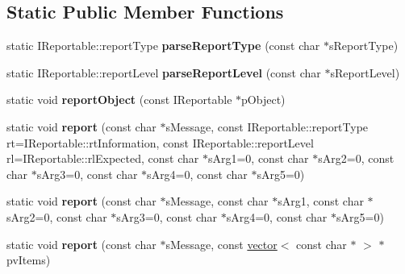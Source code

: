 \subsection*{\-Static \-Public \-Member \-Functions}
\begin{DoxyCompactItemize}
\item 
\hypertarget{classgeneral__server_1_1Debug_a8aa637f5c57017dda300b994b5d5d856}{static \-I\-Reportable\-::report\-Type {\bfseries parse\-Report\-Type} (const char $\ast$s\-Report\-Type)}\label{classgeneral__server_1_1Debug_a8aa637f5c57017dda300b994b5d5d856}

\item 
\hypertarget{classgeneral__server_1_1Debug_add6be0d439d64809767acf4dc7a276d1}{static \-I\-Reportable\-::report\-Level {\bfseries parse\-Report\-Level} (const char $\ast$s\-Report\-Level)}\label{classgeneral__server_1_1Debug_add6be0d439d64809767acf4dc7a276d1}

\item 
\hypertarget{classgeneral__server_1_1Debug_a096cdb9d3e27f8b37c7c15a867eb1047}{static void {\bfseries report\-Object} (const \-I\-Reportable $\ast$p\-Object)}\label{classgeneral__server_1_1Debug_a096cdb9d3e27f8b37c7c15a867eb1047}

\item 
\hypertarget{classgeneral__server_1_1Debug_aea15a6741aaa8d65629d28d6ee07df25}{static void {\bfseries report} (const char $\ast$s\-Message, const \-I\-Reportable\-::report\-Type rt=\-I\-Reportable\-::rt\-Information, const \-I\-Reportable\-::report\-Level rl=\-I\-Reportable\-::rl\-Expected, const char $\ast$s\-Arg1=0, const char $\ast$s\-Arg2=0, const char $\ast$s\-Arg3=0, const char $\ast$s\-Arg4=0, const char $\ast$s\-Arg5=0)}\label{classgeneral__server_1_1Debug_aea15a6741aaa8d65629d28d6ee07df25}

\item 
\hypertarget{classgeneral__server_1_1Debug_ade1b20c98d47ad33fe2fbd85dae911d4}{static void {\bfseries report} (const char $\ast$s\-Message, const char $\ast$s\-Arg1, const char $\ast$s\-Arg2=0, const char $\ast$s\-Arg3=0, const char $\ast$s\-Arg4=0, const char $\ast$s\-Arg5=0)}\label{classgeneral__server_1_1Debug_ade1b20c98d47ad33fe2fbd85dae911d4}

\item 
\hypertarget{classgeneral__server_1_1Debug_a0340016904b83223a1a8014992d47df5}{static void {\bfseries report} (const char $\ast$s\-Message, const \hyperlink{classvector}{vector}$<$ const char $\ast$ $>$ $\ast$pv\-Items)}\label{classgeneral__server_1_1Debug_a0340016904b83223a1a8014992d47df5}


\end{DoxyCompactItemize}
